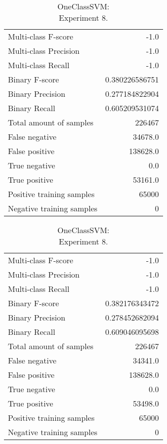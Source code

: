 \begin{table}[H]
\begin{minipage}{0.5\textwidth}

\caption{OneClassSVM: \\Experiment 7.}

\centering
\begin{tabular}{l r}
\toprule
Multi-class F-score & -1.0 \\
Multi-class Precision & -1.0 \\
Multi-class Recall & -1.0 \\
\midrule
Binary F-score & 0.380226586751 \\
Binary Precision & 0.277184822904 \\
Binary Recall & 0.605209531074 \\
\midrule
Total amount of samples & 226467 \\
False negative & 34678.0 \\
False positive & 138628.0 \\
True negative & 0.0 \\
True positive & 53161.0 \\
\midrule
Positive training samples & 65000 \\
Negative training samples & 0 \\
\bottomrule
\end{tabular}
\end{minipage}
\hfillx
\begin{minipage}{0.5\textwidth}

\caption{OneClassSVM: \\Experiment 8.}

\centering
\begin{tabular}{l r}
\toprule
Multi-class F-score & -1.0 \\
Multi-class Precision & -1.0 \\
Multi-class Recall & -1.0 \\
\midrule
Binary F-score & 0.382176343472 \\
Binary Precision & 0.278452682094 \\
Binary Recall & 0.609046095698 \\
\midrule
Total amount of samples & 226467 \\
False negative & 34341.0 \\
False positive & 138628.0 \\
True negative & 0.0 \\
True positive & 53498.0 \\
\midrule
Positive training samples & 65000 \\
Negative training samples & 0 \\
\bottomrule
\end{tabular}
\end{minipage}
\end{table}

